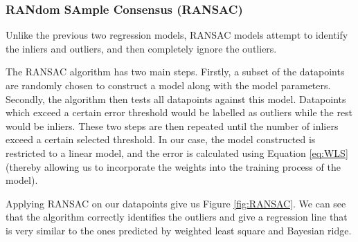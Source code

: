 \documentclass[11pt]{article}
\begin{document}
\subsubsection*{RANdom SAmple Consensus (RANSAC)}
Unlike the previous two regression models, RANSAC models attempt to identify the inliers and outliers, and then completely ignore the outliers.

The RANSAC algorithm has two main steps. Firstly, a subset of the datapoints are randomly chosen to construct a model along with the model parameters. Secondly, the algorithm then tests all datapoints against this model. Datapoints which exceed a certain error threshold would be labelled as outliers while the rest would be inliers. These two steps are then repeated until the number of inliers exceed a certain selected threshold. In our case, the model constructed is restricted to a linear model, and the error is calculated using Equation \ref{eq:WLS} (thereby allowing us to incorporate the weights into the training process of the model).

Applying RANSAC on our datapoints give us Figure \ref{fig:RANSAC}. We can see that the algorithm correctly identifies the outliers and give a regression line that is very similar to the ones predicted by weighted least square and Bayesian ridge.
\end{document}
